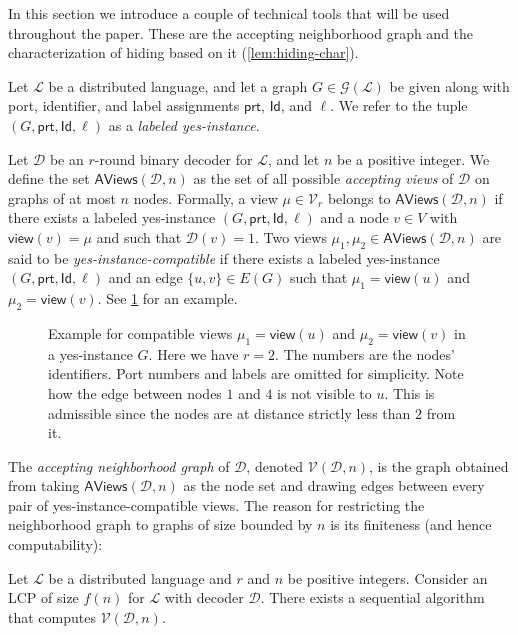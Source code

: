 \documentclass[11pt]{article}
\newcommand*{\alvgd}{\mathcal{V}(\mathcal{D},n)}
\newcommand*{\aviewsd}{\mathsf{AViews}(\mathcal{D},n)}
\newcommand*{\ids}{\mathsf{Id}}
\newcommand*{\ports}{\mathsf{prt}}
\newcommand*{\view}{\mathsf{view}}
\begin{document}
In this section we introduce a couple of technical tools that will be used
throughout the paper.
These are the accepting neighborhood graph and the characterization of hiding
based on it (\cref{lem:hiding-char}).

Let $\mathcal{L}$ be a distributed language, and let a graph $G \in
\mathcal{G}(\mathcal{L})$ be given along with port, identifier, and label
assignments $\ports$, $\ids$, and $\ell$.
We refer to the tuple $(G,\ports, \ids, \ell)$ as a \emph{labeled yes-instance}.

Let $\mathcal{D}$ be an $r$-round binary decoder for $\mathcal{L}$, and let $n$
be a positive integer. 
We define the set $\aviewsd$ as the set of all possible \emph{accepting views} of
$\mathcal{D}$ on graphs of at most $n$ nodes. 
Formally, a view $\mu \in \mathcal{V}_r$ belongs to $\aviewsd$ if there exists a
labeled yes-instance $(G,\ports, \ids, \ell)$ and a node $v \in V$ with
$\view(v) = \mu$ and such that $\mathcal{D}(v) = 1$.
Two views $\mu_1, \mu_2 \in \aviewsd$ are said to be
\emph{yes-instance-compatible} if there exists a labeled yes-instance $(G,
\ports, \ids, \ell)$ and an edge $\{u,v\}\in E(G)$ such that $\mu_1 = \view(u)$
and $\mu_2 = \view(v)$.
See \cref{fig:compatible-view-ex} for an example.

\begin{figure}
  \centering
  
  \caption{Example for compatible views $\mu_1 = \view(u)$ and $\mu_2 =
    \view(v)$ in a yes-instance $G$.
    Here we have $r = 2$.
    The numbers are the nodes' identifiers.
    Port numbers and labels are omitted for simplicity.
    Note how the edge between nodes $1$ and $4$ is not visible to $u$.
    This is admissible since the nodes are at distance strictly less than $2$
    from it.}
  \label{fig:compatible-view-ex}
\end{figure}

The \emph{accepting neighborhood graph} of $\mathcal{D}$, denoted $\alvgd$, is
the graph obtained from taking $\aviewsd$ as the node set and drawing edges
between every pair of yes-instance-compatible views. 
The reason for restricting the neighborhood graph to graphs of size bounded by
$n$ is its finiteness (and hence computability):

\begin{lemma}
  \label{lem:alg-construct-alvg}
  Let $\mathcal{L}$ be a distributed language and $r$ and $n$ be positive
  integers. 
  Consider an LCP of size $f(n)$ for $\mathcal{L}$ with decoder $\mathcal{D}$.
  There exists a sequential algorithm that computes $\alvgd$.
\end{lemma}
\end{document}
